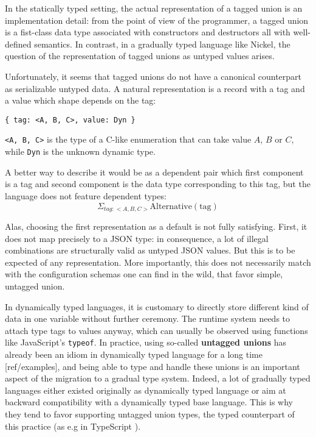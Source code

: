 \documentclass{article}
\begin{document}
In the statically typed setting, the actual representation of a tagged union is
an implementation detail: from the point of view of the programmer, a tagged
union is a fist-class data type associated with constructors and destructors all
with well-defined semantics. In contrast, in a gradually typed language like
Nickel, the question of the representation of tagged unions as untyped values
arises.

Unfortunately, it seems that tagged unions do not have a canonical counterpart
as serializable untyped data. A natural representation is a record with a tag
and a value which shape depends on the tag:

\begin{lstlisting}
{ tag: <A, B, C>, value: Dyn }
\end{lstlisting}

\lstinline+<A, B, C>+ is the type of a C-like enumeration that can take value
$A$, $B$ or $C$, while \lstinline+Dyn+ is the unknown dynamic type.

A better way to describe it would be as a dependent pair which first component
is a tag and second component is the data type corresponding to this tag, but
the language does not feature dependent types:
\[
    \Sigma_{tag : <A, B, C>} \text{Alternative}(\text{tag})
\]

Alas, choosing the first representation as a default is not fully satisfying.
First, it does not map precisely to a JSON type: in consequence, a lot of
illegal combinations are structurally valid as untyped JSON values. But this is
to be expected of any representation. More importantly, this does not
necessarily match with the configuration schemas one can find in the wild, that
favor simple, untagged union.

In dynamically typed languages, it is customary to directly store different kind
of data in one variable without further ceremony. The runtime system needs to
attach type tags to values anyway, which can usually be observed using functions
like JavaScript's \verb+typeof+. In practice, using so-called \textbf{untagged
unions} has already been an idiom in dynamically typed language for a long time
[ref/examples], and being able to type and handle these unions is an important
aspect of the migration to a gradual type system. Indeed, a lot of gradually
typed languages either existed originally as dynamically typed language or aim
at backward compatibility with a dynamically typed base language. This is why
they tend to favor supporting untagged union types, the typed counterpart of
this practice (as e.g in TypeScript \cite{TypeScriptUnions}).
\end{document}
